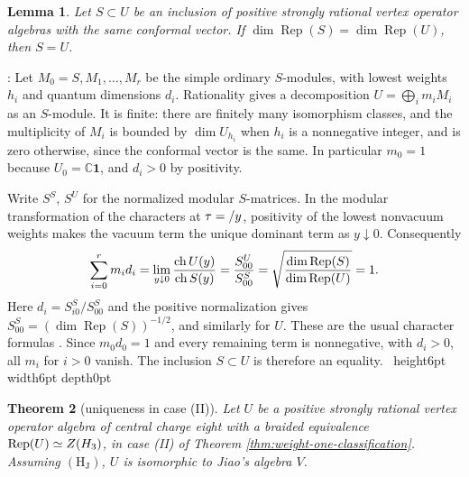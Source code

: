 \documentclass[leqno]{article}
\newcommand{\Cbb}{\ensuremath{\mathbb{C}}}
\let\cal\relax
\newcommand{\cal}{\mathcal}
\newcommand{\qed}{\hfill \vrule height6pt  width6pt depth0pt}
\let\i\relax
\newcommand{\i}{\mathrm{i}}
\DeclareMathOperator{\Rep}{Rep}
\newtheorem{thm}{Theorem}[section]
\newtheorem{lemma}[thm]{Lemma}
\newenvironment{proof}[1][]{\noindent {\it Proof #1} : }{\hbox{~}\qed
\smallskip
}
\numberwithin{equation}{section}
\begin{document}
\begin{lemma}
\label{lem:equal-global-dimension}
Let $S \subset U$ be an inclusion of positive strongly rational vertex operator algebras with the same conformal vector. If $\dim\Rep(S) = \dim\Rep(U)$, then $S = U$.
\end{lemma}

\begin{proof}
Let $M_0 = S,M_1,\ldots,M_r$ be the simple ordinary $S$-modules, with lowest weights $h_i$ and quantum dimensions $d_i$. Rationality gives a decomposition $U = \bigoplus_i m_iM_i$ as an $S$-module. It is finite: there are finitely many isomorphism classes, and the multiplicity of $M_i$ is bounded by $\dim U_{h_i}$ when $h_i$ is a nonnegative integer, and is zero otherwise, since the conformal vector is the same. In particular $m_0 = 1$ because $U_0 = \Cbb\mathbf 1$, and $d_i > 0$ by positivity.

Write $S^S$, $S^U$ for the normalized modular $S$-matrices. In the modular transformation of the characters at $\tau = \i/y$, positivity of the lowest nonvacuum weights makes the vacuum term the unique dominant term as $y \downarrow 0$. Consequently
\[
\sum_{i=0}^r m_i d_i
= \lim_{y \downarrow 0}\frac{\operatorname{ch}U(\i y)}{\operatorname{ch}S(\i y)}
= \frac{S^U_{00}}{S^S_{00}}
= \sqrt{\frac{\dim\Rep(S)}{\dim\Rep(U)}}
= 1.
\]
Here $d_i = S^S_{i0}/S^S_{00}$ and the positive normalization gives $S^S_{00} = (\dim\Rep(S))^{-1/2}$, and similarly for $U$. These are the usual character formulas \cite{Hua08,DJX13}. Since $m_0d_0 = 1$ and every remaining term is nonnegative, with $d_i > 0$, all $m_i$ for $i > 0$ vanish. The inclusion $S \subset U$ is therefore an equality.
\end{proof}

\begin{thm}[uniqueness in case (II)]
\label{thm:uniqueness-two}
Let $U$ be a positive strongly rational vertex operator algebra of central charge eight with a braided equivalence $\Rep(U) \simeq Z(\cal H_3)$, in case (II) of Theorem \ref{thm:weight-one-classification}. Assuming $\mathrm{(H_J)}$, $U$ is isomorphic to Jiao's algebra $V$.
\end{thm}
\end{document}
